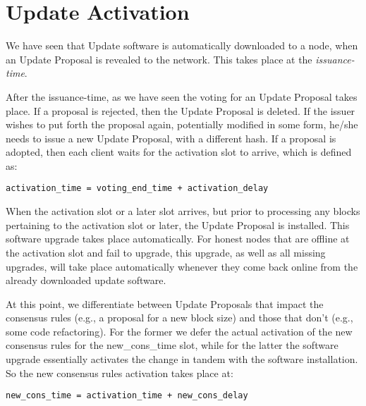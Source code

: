 \section{Update Activation}

We have seen that Update software is automatically downloaded to a node, when an Update Proposal is revealed to the network. This takes place at the \emph{issuance-time}. 

After the issuance-time, as we have seen the voting for an Update Proposal takes place. If a proposal is rejected, then the Update Proposal is deleted. If the issuer wishes to put forth the proposal again, potentially modified in some form, he/she needs to issue a new Update Proposal, with a different hash. If a proposal is adopted, then each client waits for the activation slot to arrive, which is defined as:
\begin{verbatim}
activation_time = voting_end_time + activation_delay
\end{verbatim}

When the activation slot or a later slot arrives, but prior to processing any blocks pertaining to the activation slot or later, the Update Proposal is installed. This software upgrade takes place automatically. For honest nodes that are offline at the activation slot and fail to upgrade, this upgrade, as well as all missing upgrades, will take place automatically whenever they come back online from the already downloaded update software. 

At this point, we differentiate between Update Proposals that impact the consensus rules (e.g., a proposal for a new block size) and those that don't (e.g., some code refactoring). For the former we defer the actual activation of the new consensus rules for the new\_cons\_time slot, while for the latter the software upgrade essentially activates the change in tandem with the software installation. So the new consensus rules activation takes place at:
\begin{verbatim}
new_cons_time = activation_time + new_cons_delay
\end{verbatim}


